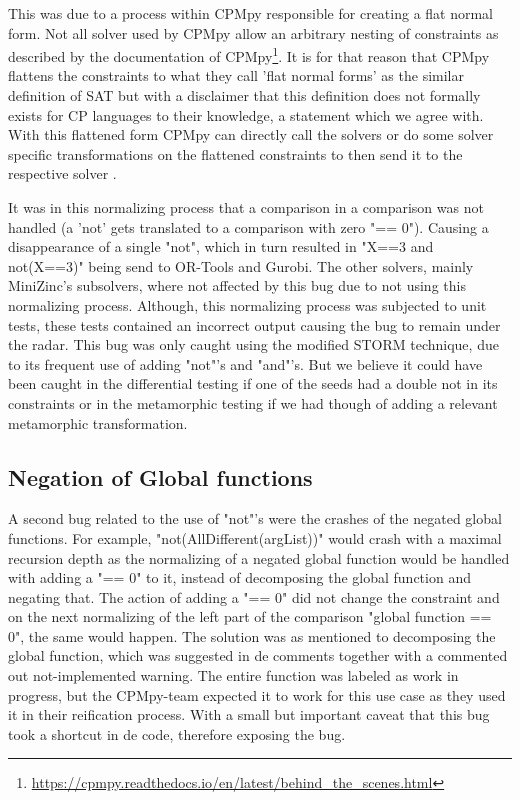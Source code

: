 This was due to a process within CPMpy responsible for creating a flat normal form. Not all solver used by CPMpy allow an arbitrary nesting of constraints as described by the documentation of CPMpy\footnote{\url{https://cpmpy.readthedocs.io/en/latest/behind_the_scenes.html}}. It is for that reason that CPMpy flattens the constraints to what they call 'flat normal forms' as the similar definition of SAT but with a disclaimer that this definition does not formally exists for CP languages to their knowledge, a statement which we agree with. With this flattened form CPMpy can directly call the solvers or do some solver specific transformations on the flattened constraints to then send it to the respective solver \cite{CPMpyGithub}. 

It was in this normalizing process that a comparison in a comparison was not handled (a 'not' gets translated to a comparison with zero "== 0"). Causing a disappearance of a single "not", which in turn resulted in "X==3 and not(X==3)" being send to OR-Tools and Gurobi. The other solvers, mainly MiniZinc's subsolvers, where not affected by this bug due to not using this normalizing process. Although, this normalizing process was subjected to unit tests, these tests contained an incorrect output causing the bug to remain under the radar. This bug was only caught using the modified STORM technique, due to its frequent use of adding "not"'s and "and"'s. But we believe it could have been caught in the differential testing if one of the seeds had a double not in its constraints or in the metamorphic testing if we had though of adding a relevant metamorphic transformation.


\subsection{Negation of Global functions}
\label{res:bug:NegatedGlobal}
A second bug related to the use of "not"'s were the crashes of the negated global functions. For example, "not(AllDifferent(argList))" would crash with a maximal recursion depth as the normalizing of a negated global function would be handled with adding a "== 0" to it, instead of decomposing the global function and negating that. The action of adding a "== 0" did not change the constraint and on the next normalizing of the left part of the comparison "global function == 0", the same would happen. The solution was as mentioned to decomposing the global function, which was suggested in de comments together with a commented out not-implemented warning. The entire function was labeled as work in progress, but the CPMpy-team expected it to work for this use case as they used it in their reification process. With a small but important caveat that this bug took a shortcut in de code, therefore exposing the bug. 

